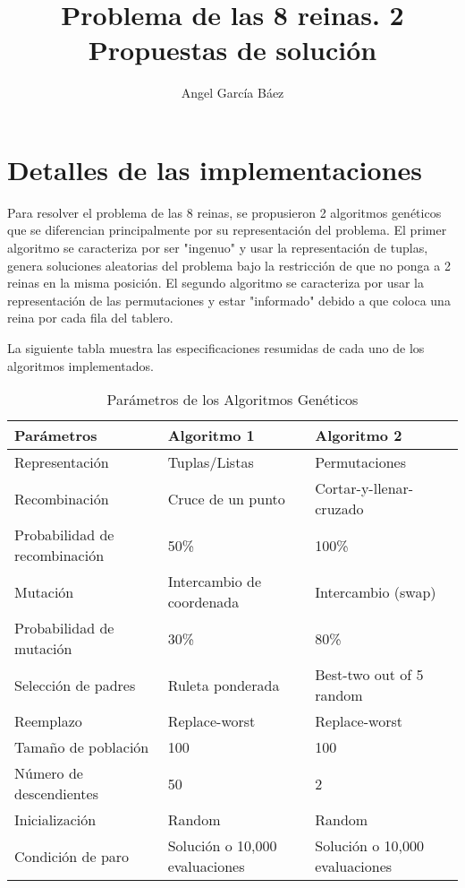 \documentclass[runningheads]{llncs}
\begin{document}
%
\title{Problema de las 8 reinas. 2 Propuestas de solución}
\author{Angel García Báez }
%
\maketitle              %
%
%
%
\section{Detalles de las implementaciones}

Para resolver el problema de las 8 reinas, se propusieron 2 algoritmos genéticos que se diferencian principalmente por su representación del problema. El primer algoritmo se caracteriza por ser "ingenuo" y usar la representación de tuplas, genera soluciones aleatorias del problema bajo la restricción de que no ponga a 2 reinas en la misma posición.
 El segundo algoritmo se caracteriza por usar la representación de las permutaciones y estar "informado" debido a que coloca una reina por cada fila del tablero.

La siguiente tabla muestra las especificaciones resumidas de cada uno de los algoritmos implementados.

\begin{table}
	\caption{Parámetros de los Algoritmos Genéticos}\label{tab3}
	\begin{tabular}{|l|l|l|}
		\hline
		Parámetros & Algoritmo 1 & Algoritmo 2 \\
		\hline
		Representación & Tuplas/Listas & Permutaciones \\
		\hline
		Recombinación & Cruce de un punto & Cortar-y-llenar-cruzado \\
		\hline
		Probabilidad de recombinación & 50\% & 100\% \\
		\hline
		Mutación & Intercambio de coordenada & Intercambio (swap) \\
		\hline
		Probabilidad de mutación & 30\% & 80\% \\
		\hline
		Selección de padres & Ruleta ponderada & Best-two out of 5 random \\
		\hline
		Reemplazo & Replace-worst & Replace-worst \\
		\hline
		Tamaño de población & 100 & 100 \\
		\hline
		Número de descendientes & 50 & 2 \\
		\hline
		Inicialización & Random & Random \\
		\hline
		Condición de paro & Solución o 10,000 evaluaciones & Solución o 10,000 evaluaciones \\
		\hline
	\end{tabular}
\end{table}
\end{document}
